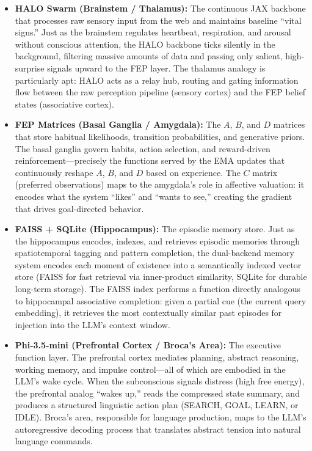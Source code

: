 \begin{itemize}
    \item \textbf{HALO Swarm (Brainstem / Thalamus):} The continuous JAX backbone that processes raw sensory input from the web and maintains baseline ``vital signs.'' Just as the brainstem regulates heartbeat, respiration, and arousal without conscious attention, the HALO backbone ticks silently in the background, filtering massive amounts of data and passing only salient, high-surprise signals upward to the FEP layer. The thalamus analogy is particularly apt: HALO acts as a relay hub, routing and gating information flow between the raw perception pipeline (sensory cortex) and the FEP belief states (associative cortex).

    \item \textbf{FEP Matrices (Basal Ganglia / Amygdala):} The $A$, $B$, and $D$ matrices that store habitual likelihoods, transition probabilities, and generative priors. The basal ganglia govern habits, action selection, and reward-driven reinforcement---precisely the functions served by the EMA updates that continuously reshape $A$, $B$, and $D$ based on experience. The $C$ matrix (preferred observations) maps to the amygdala's role in affective valuation: it encodes what the system ``likes'' and ``wants to see,'' creating the gradient that drives goal-directed behavior.

    \item \textbf{FAISS + SQLite (Hippocampus):} The episodic memory store. Just as the hippocampus encodes, indexes, and retrieves episodic memories through spatiotemporal tagging and pattern completion, the dual-backend memory system encodes each moment of existence into a semantically indexed vector store (FAISS for fast retrieval via inner-product similarity, SQLite for durable long-term storage). The FAISS index performs a function directly analogous to hippocampal associative completion: given a partial cue (the current query embedding), it retrieves the most contextually similar past episodes for injection into the LLM's context window.

    \item \textbf{Phi-3.5-mini (Prefrontal Cortex / Broca's Area):} The executive function layer. The prefrontal cortex mediates planning, abstract reasoning, working memory, and impulse control---all of which are embodied in the LLM's wake cycle. When the subconscious signals distress (high free energy), the prefrontal analog ``wakes up,'' reads the compressed state summary, and produces a structured linguistic action plan (SEARCH, GOAL, LEARN, or IDLE). Broca's area, responsible for language production, maps to the LLM's autoregressive decoding process that translates abstract tension into natural language commands.


\end{itemize}
